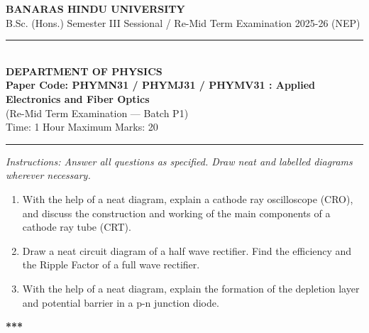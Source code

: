 \documentclass[11pt,a4paper]{article}
\begin{document}
\begin{center}
  {\large\bfseries BANARAS HINDU UNIVERSITY}\\[2pt]
  {\normalsize B.Sc. (Hons.) Semester III Sessional / Re-Mid Term Examination 2025-26 (NEP)}\\[6pt]
  \rule{0.8\linewidth}{0.5pt}\\[6pt]
  {\large\bfseries DEPARTMENT OF PHYSICS}\\[4pt]
  {\large\bfseries Paper Code: PHYMN31 / PHYMJ31 / PHYMV31 : Applied Electronics and Fiber Optics}\\[2pt]
  {\normalsize (Re-Mid Term Examination --- Batch P1)}\\[4pt]
  {\normalsize Time: 1 Hour \hfill Maximum Marks: 20}
\end{center}
\rule{\linewidth}{0.4pt}
\smallskip

\noindent \textit{Instructions: Answer all questions as specified. Draw neat and labelled diagrams wherever necessary.}

\bigskip

\begin{enumerate}[label=\textbf{\arabic*.},leftmargin=*,itemsep=16pt]

  \item With the help of a neat diagram, explain a cathode ray oscilloscope (CRO), and discuss the construction and working of the main components of a cathode ray tube (CRT).

  \item Draw a neat circuit diagram of a half wave rectifier. Find the efficiency and the Ripple Factor of a full wave rectifier.

  \item With the help of a neat diagram, explain the formation of the depletion layer and potential barrier in a p-n junction diode.

\end{enumerate}

\bigskip
\begin{center}
  \textbf{***}
\end{center}
\end{document}
